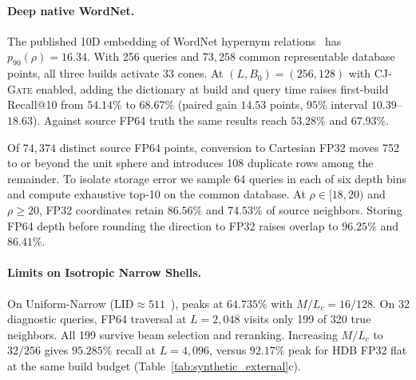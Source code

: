 \paragraph{Deep native WordNet.}
The published 10D embedding of WordNet hypernym relations~\cite{sala2018representation} has $p_{90}(\rho)=16.34$. With 256 queries and $73{,}258$ common representable database points, all three builds activate 33 cones. At $(L,B_0)=(256,128)$ with \textsc{CJ-Gate} enabled, adding the dictionary at build and query time raises first-build Recall@10 from $54.14\%$ to $68.67\%$ (paired gain $14.53$ points, $95\%$ interval $10.39$--$18.63$). Against source FP64 truth the same results reach $53.28\%$ and $67.93\%$.

Of $74{,}374$ distinct source FP64 points, conversion to Cartesian FP32 moves 752 to or beyond the unit sphere and introduces 108 duplicate rows among the remainder. To isolate storage error we sample 64 queries in each of six depth bins and compute exhaustive top-10 on the common database. At $\rho\in[18,20)$ and $\rho\ge20$, FP32 coordinates retain $86.56\%$ and $74.53\%$ of source neighbors. Storing FP64 depth before rounding the direction to FP32 raises overlap to $96.25\%$ and $86.41\%$.

\paragraph{Limits on Isotropic Narrow Shells.}
On Uniform-Narrow ($\mathrm{LID}\approx511$~\cite{houle2017lid}), \rquiver{} peaks at $64.735\%$ with $M/L_c=16/128$. On 32 diagnostic queries, FP64 traversal at $L=2{,}048$ visits only 199 of 320 true neighbors. All 199 survive beam selection and reranking. Increasing $M/L_c$ to $32/256$ gives $95.285\%$ recall at $L=4{,}096$, versus $92.17\%$ peak for HDB FP32 flat at the same build budget (Table~\ref{tab:synthetic_external}c).
